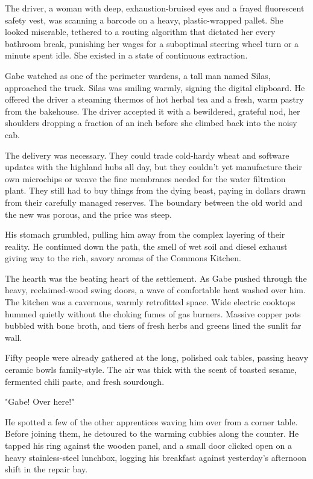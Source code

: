 The driver, a woman with deep, exhaustion-bruised eyes and a frayed fluorescent safety vest, was scanning a barcode on a heavy, plastic-wrapped pallet. She looked miserable, tethered to a routing algorithm that dictated her every bathroom break, punishing her wages for a suboptimal steering wheel turn or a minute spent idle. She existed in a state of continuous extraction.

Gabe watched as one of the perimeter wardens, a tall man named Silas, approached the truck. Silas was smiling warmly, signing the digital clipboard. He offered the driver a steaming thermos of hot herbal tea and a fresh, warm pastry from the bakehouse. The driver accepted it with a bewildered, grateful nod, her shoulders dropping a fraction of an inch before she climbed back into the noisy cab. 

The delivery was necessary. They could trade cold-hardy wheat and software updates with the highland hubs all day, but they couldn't yet manufacture their own microchips or weave the fine membranes needed for the water filtration plant. They still had to buy things from the dying beast, paying in dollars drawn from their carefully managed reserves. The boundary between the old world and the new was porous, and the price was steep.

His stomach grumbled, pulling him away from the complex layering of their reality. He continued down the path, the smell of wet soil and diesel exhaust giving way to the rich, savory aromas of the Commons Kitchen.

The hearth was the beating heart of the settlement. As Gabe pushed through the heavy, reclaimed-wood swing doors, a wave of comfortable heat washed over him. The kitchen was a cavernous, warmly retrofitted space. Wide electric cooktops hummed quietly without the choking fumes of gas burners. Massive copper pots bubbled with bone broth, and tiers of fresh herbs and greens lined the sunlit far wall.

Fifty people were already gathered at the long, polished oak tables, passing heavy ceramic bowls family-style. The air was thick with the scent of toasted sesame, fermented chili paste, and fresh sourdough. 

"Gabe! Over here!" 

He spotted a few of the other apprentices waving him over from a corner table. Before joining them, he detoured to the warming cubbies along the counter. He tapped his ring against the wooden panel, and a small door clicked open on a heavy stainless-steel lunchbox, logging his breakfast against yesterday's afternoon shift in the repair bay.

